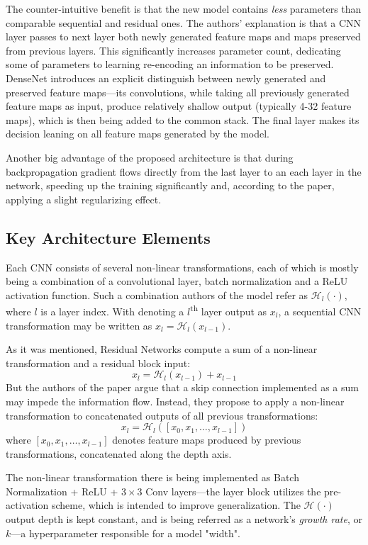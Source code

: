 \documentclass[thesis=B,english]{FITthesis}[2019/12/23]
\begin{document}
The counter-intuitive benefit is that the new model contains \textit{less} parameters than comparable sequential and residual ones. The authors' explanation is that a CNN layer passes to next layer both newly generated feature maps and maps preserved from previous layers. This significantly increases parameter count, dedicating some of parameters to learning re-encoding an information to be preserved. DenseNet introduces an explicit distinguish between newly generated and preserved feature maps---its convolutions, while taking all previously generated feature maps as input, produce relatively shallow output (typically 4-32 feature maps), which is then being added to the common stack. The final layer makes its decision leaning on all feature maps generated by the model.

Another big advantage of the proposed architecture is that during backpropagation gradient flows directly from the last layer to an each layer in the network, speeding up the training significantly and, according to the paper, applying a slight regularizing effect.

\subsection{Key Architecture Elements}

Each CNN consists of several non-linear transformations, each of which is mostly being a combination of a convolutional layer, batch normalization and a ReLU activation function. Such a combination authors of the model refer as $\mathcal{H}_l(\cdot)$, where $l$ is a layer index. With denoting a $l$\textsuperscript{th} layer output as $x_l$, a sequential CNN transformation may be written as $x_l = \mathcal{H}_l(x_{l-1})$.

As it was mentioned, Residual Networks compute a sum of a non-linear transformation and a residual block input:
\[x_l = \mathcal{H}_l(x_{l-1}) + x_{l-1}\]
But the authors of the paper\cite{densenet} argue that a skip connection implemented as a sum may impede the information flow. Instead, they propose to apply a non-linear transformation to concatenated outputs of all previous transformations:
\[x_l = \mathcal{H}_l([x_0, x_1,\dots,x_{l-1}])\]
where $[x_0, x_1,\dots,x_{l-1}]$ denotes feature maps produced by previous transformations, concatenated along the depth axis.

The non-linear transformation there is being implemented as Batch Normalization + ReLU + $3 \times 3$ Conv layers---the layer block utilizes the pre-activation scheme, which is intended to improve generalization\cite{identity_mappings}. The $\mathcal{H}(\cdot)$ output depth is kept constant, and is being referred as a network's \textit{growth rate}, or $k$---a hyperparameter responsible for a model "width".
\end{document}
